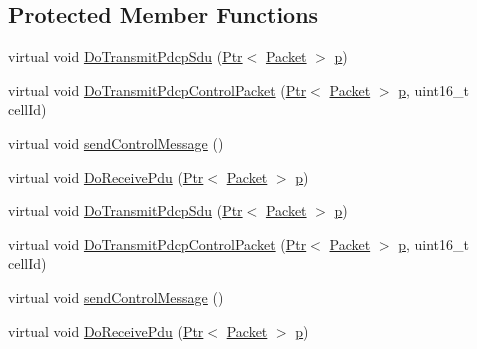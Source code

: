 \subsection*{Protected Member Functions}
\begin{DoxyCompactItemize}
\item 
virtual void \hyperlink{classns3_1_1McUePdcp_a6f7d312462876233db7af157799ba639}{Do\+Transmit\+Pdcp\+Sdu} (\hyperlink{classns3_1_1Ptr}{Ptr}$<$ \hyperlink{classns3_1_1Packet}{Packet} $>$ \hyperlink{lte__link__budget__x2__handover__measures_8m_ac9de518908a968428863f829398a4e62}{p})
\item 
virtual void \hyperlink{classns3_1_1McUePdcp_a4562b287742858f4277a9ac25aa76f5e}{Do\+Transmit\+Pdcp\+Control\+Packet} (\hyperlink{classns3_1_1Ptr}{Ptr}$<$ \hyperlink{classns3_1_1Packet}{Packet} $>$ \hyperlink{lte__link__budget__x2__handover__measures_8m_ac9de518908a968428863f829398a4e62}{p}, uint16\+\_\+t cell\+Id)
\item 
virtual void \hyperlink{classns3_1_1McUePdcp_ac6c0ba596bcf4bfeb6b9e4ae59bf8240}{send\+Control\+Message} ()
\item 
virtual void \hyperlink{classns3_1_1McUePdcp_a98d45c04cf0a2b10b2dd79efc3db62d8}{Do\+Receive\+Pdu} (\hyperlink{classns3_1_1Ptr}{Ptr}$<$ \hyperlink{classns3_1_1Packet}{Packet} $>$ \hyperlink{lte__link__budget__x2__handover__measures_8m_ac9de518908a968428863f829398a4e62}{p})
\item 
virtual void \hyperlink{classns3_1_1McUePdcp_a575fc81984c3169a4b7a5ef7ec5f3765}{Do\+Transmit\+Pdcp\+Sdu} (\hyperlink{classns3_1_1Ptr}{Ptr}$<$ \hyperlink{classns3_1_1Packet}{Packet} $>$ \hyperlink{lte__link__budget__x2__handover__measures_8m_ac9de518908a968428863f829398a4e62}{p})
\item 
virtual void \hyperlink{classns3_1_1McUePdcp_a60defc84a18ea98ba6f8742c312f5c2e}{Do\+Transmit\+Pdcp\+Control\+Packet} (\hyperlink{classns3_1_1Ptr}{Ptr}$<$ \hyperlink{classns3_1_1Packet}{Packet} $>$ \hyperlink{lte__link__budget__x2__handover__measures_8m_ac9de518908a968428863f829398a4e62}{p}, uint16\+\_\+t cell\+Id)
\item 
virtual void \hyperlink{classns3_1_1McUePdcp_af0045aa658110bc92eb26a9294d51406}{send\+Control\+Message} ()
\item 
virtual void \hyperlink{classns3_1_1McUePdcp_a080ce04174dbacf434f6353aeccb8606}{Do\+Receive\+Pdu} (\hyperlink{classns3_1_1Ptr}{Ptr}$<$ \hyperlink{classns3_1_1Packet}{Packet} $>$ \hyperlink{lte__link__budget__x2__handover__measures_8m_ac9de518908a968428863f829398a4e62}{p})
\end{DoxyCompactItemize}
